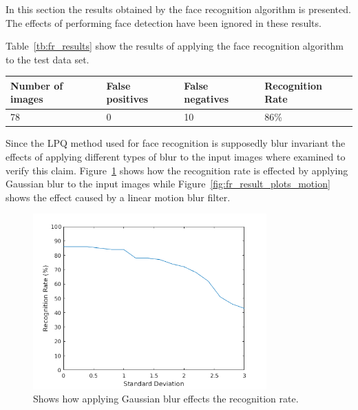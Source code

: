 In this section the results obtained by the face recognition algorithm is  presented. The effects of performing face detection have been ignored in these results.

Table~\ref{tb:fr_results} show the results of applying the face recognition algorithm to the test data set.

\begin{center}
  \label{tb:fr_results}
    \begin{tabular}{ | l | l | l | l |}
    \hline
    Number of images & False positives & False negatives & Recognition Rate \\ \hline
    78 & 0 & 10 & 86\% \\ \hline
    \end{tabular}
\end{center}

Since the LPQ method used for face recognition is supposedly blur invariant the effects of applying different types of blur to the input images where examined to verify this claim. Figure~\ref{fig:fr_result_plots_gauss} shows how the recognition rate is effected by applying Gaussian blur to the input images while Figure~\ref{fig:fr_result_plots_motion} shows the effect caused by a linear motion blur filter.

\begin{figure}[H]
\centering
\includegraphics[width=0.8\textwidth]{img/blur_test/gauss_plot.png}
\caption{Shows how applying Gaussian blur effects the recognition rate.}
\label{fig:fr_result_plots_gauss}
\end{figure}

